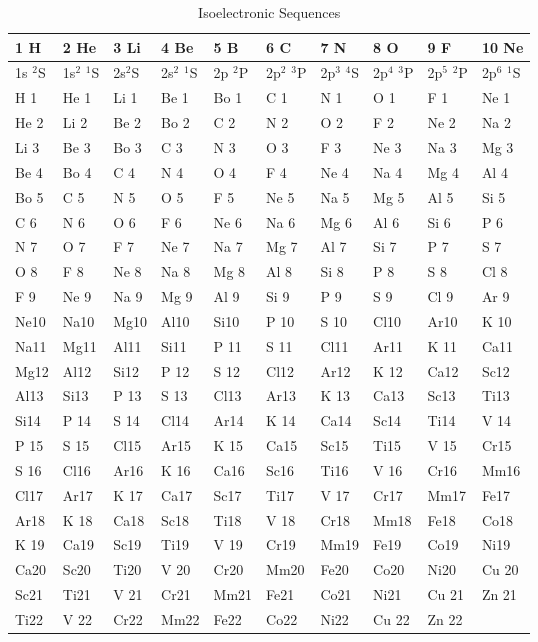 \begin{table}
\label{tab:IsoSequences}
\caption{Isoelectronic Sequences}
\begin{tabular}{llllllllll}
\hline
1 H&   2 He&  3 Li&  4 Be&  5 B&  6 C&  7 N&  8 O&  9 F&  10 Ne\\
\hline
1s $^2$S& 1s$^2$ $^1$S& 2s$^2$S& 2s$^2$ $^1$S& 2p $^2$P& 2p$^2$ $^3$P&
2p$^3$ $^4$S& 2p$^4$ $^3$P& 2p$^5$ $^2$P& 2p$^6$ $^1$S\\
H 1& He 1& Li 1& Be 1& Bo 1& C 1& N 1& O 1& F 1& Ne 1\\
He 2& Li 2& Be 2& Bo 2& C 2& N 2& O 2& F 2& Ne 2& Na 2\\
Li 3& Be 3& Bo 3& C 3& N 3& O
3& F 3& Ne 3& Na 3& Mg 3\\
Be 4& Bo 4& C 4& N 4& O 4& F 4& Ne 4& Na 4& Mg 4& Al 4\\
Bo 5& C 5& N 5& O
5& F 5& Ne 5& Na 5& Mg 5& Al 5& Si 5\\
C 6& N 6& O 6& F 6& Ne 6& Na 6& Mg 6& Al 6& Si 6& P 6\\
N 7& O 7& F 7& Ne 7& Na 7& Mg 7& Al 7& Si 7& P 7& S 7\\
O 8& F  8& Ne 8& Na 8& Mg 8& Al 8& Si 8& P  8& S  8&Cl 8\\
F 9& Ne 9& Na 9& Mg 9& Al 9& Si 9& P  9& S 9& Cl 9& Ar 9\\
 Ne10& Na10&Mg10& Al10& Si10& P 10& S
10& Cl10& Ar10& K 10\\
Na11& Mg11& Al11& Si11& P 11& S 11& Cl11& Ar11& K 11& Ca11\\
 Mg12& Al12&
Si12& P 12& S
12& Cl12& Ar12& K 12& Ca12& Sc12\\
Al13& Si13& P 13& S 13& Cl13& Ar13& K 13& Ca13& Sc13& Ti13\\
Si14& P 14&
S 14& Cl14& Ar14& K 14& Ca14& Sc14& Ti14& V 14\\
P 15& S 15& Cl15& Ar15& K 15& Ca15& Sc15& Ti15& V 15& Cr15\\
S 16& Cl16& Ar16& K 16& Ca16& Sc16& Ti16& V 16& Cr16& Mm16\\
Cl17& Ar17&K 17& Ca17& Sc17& Ti17& V 17& Cr17& Mm17& Fe17\\
Ar18& K 18& Ca18& Sc18& Ti18& V 18& Cr18& Mm18& Fe18& Co18\\
K 19& Ca19& Sc19& Ti19& V
19& Cr19& Mm19& Fe19& Co19& Ni19\\
Ca20& Sc20& Ti20& V 20& Cr20& Mm20& Fe20& Co20& Ni20& Cu 20\\
Sc21& Ti21& V
21& Cr21& Mm21& Fe21& Co21& Ni21& Cu 21& Zn 21\\
Ti22& V 22& Cr22& Mm22& Fe22& Co22& Ni22& Cu 22& Zn 22\\

\end{tabular}
\end{table}
